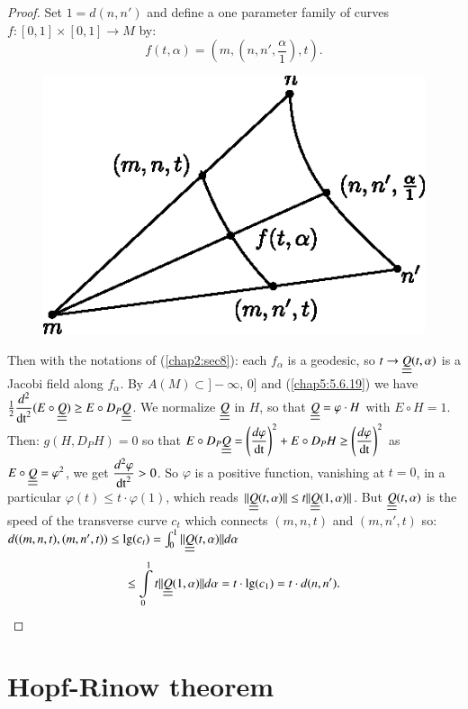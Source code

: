 \begin{proof}
Set $1=d(n,n')$ and define a one parameter family of curves
$f:[0,1]\times [0,1]\to M$ by: 
$$
f(t,\alpha)=\left(m,\left(n,n',\frac{\alpha}{1}\right),t\right).
$$
\begin{figure}[H]
\centering
\includegraphics{figures/chap7-fig5.eps}
\end{figure}
\noindent
Then with the notations of (\ref{chap2:sec8}): each $f_{\alpha}$ is a
geodesic, so $t\to \underline{\underline{Q}}(t,\alpha)$ is a Jacobi field along
$f_{\alpha}$. By \pageoriginale $A(M)\subset ]-\infty$, $0]$ and
  (\ref{chap5:5.6.19}) we have $\frac{1}{2}\dfrac{d^{2}}{\operatorname{dt}^{2}}(E\circ
  \underline{\underline{Q}})\geq E\circ D_{P}\underline{\underline{Q}}$. We normalize $\underline{\underline{Q}}$ in $H$, so
  that $\underline{\underline{Q}}=\varphi\cdot H$ with $E\circ H=1$. Then:
  $g(H,D_{P}H)=0$ so that $E\circ
  D_{P}\underline{\underline{Q}}=\left(\dfrac{d\varphi}{\operatorname{dt}}\right)^{2}+E\circ D_{P}H\geq
  \left(\dfrac{d\varphi}{\operatorname{dt}}\right)^{2}$ as
  $E\circ\underline{\underline{Q}}=\varphi^{2}$, we get
  $\dfrac{d^{2}\varphi}{\operatorname{dt}^{2}}>0$. So $\varphi$ is a positive
  function, vanishing at $t=0$, in a particular $\varphi(t)\leq
  t\cdot\varphi(1)$, which reads $||\underline{\underline{Q}}(t,\alpha)||\leq
  t||\underline{\underline{Q}}(1,\alpha)||$. But $\underline{\underline{Q}}(t,\alpha)$ is the speed of the
  transverse curve $c_{t}$ which connects $(m,n,t)$ and $(m,n',t)$ so:
  $d((m,n,t),(m,n',t))\leq
  \lg(c_{t})=\int^{1}_{0}||\underline{\underline{Q}}(t,\alpha)||d\alpha$
$$
\leq
\int\limits^{1}_{0}t||\underline{\underline{Q}}(1,\alpha)||d\alpha=t\cdot\lg(c_{1})=t\cdot
d(n,n'). 
$$
\end{proof}

\section{Hopf-Rinow theorem}\label{chap7:chap7-sec4}

